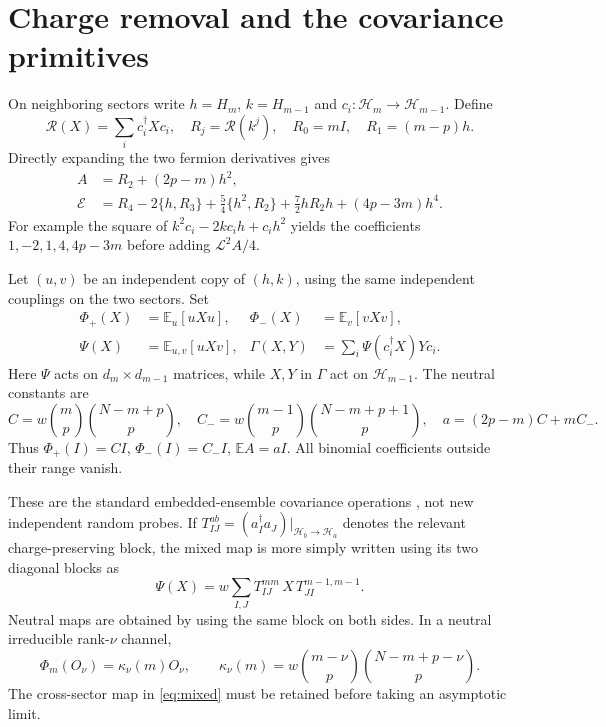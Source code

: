 \documentclass[11pt,a4paper]{article}
\newcommand{\EE}{\mathbb E}
\newcommand{\rr}{\mathcal R}
\newcommand{\core}{\mathcal E}
\begin{document}
\newpage
\section{Charge removal and the covariance primitives}
On neighboring sectors write $h=H_m$, $k=H_{m-1}$ and
$c_i:\mathcal H_m\to\mathcal H_{m-1}$. Define
\begin{equation}
 \rr(X)=\sum_i c_i^\dagger Xc_i,\quad R_j=\rr(k^j),\quad
 R_0=mI,\quad R_1=(m-p)h.
\end{equation}
Directly expanding the two fermion derivatives gives
\begin{align}
 A&=R_2+(2p-m)h^2,\\
 \core&=R_4-2\{h,R_3\}+\tfrac54\{h^2,R_2\}
                  +\tfrac72 hR_2h+(4p-3m)h^4. \label{eq:raw}
\end{align}
For example the square of
$k^2c_i-2kc_ih+c_ih^2$ yields the coefficients
$1,-2,1,4,4p-3m$ before adding $\mathcal L^2A/4$.

Let $(u,v)$ be an independent copy of $(h,k)$, using the same
independent couplings on the two sectors. Set
\begin{align}
 \Phi_+(X)&=\EE_u[uXu],&\Phi_-(X)&=\EE_v[vXv],\\
 \Psi(X)&=\EE_{u,v}[uXv],&
 \Gamma(X,Y)&=\sum_i\Psi(c_i^\dagger X)Yc_i. \label{eq:maps}
\end{align}
Here $\Psi$ acts on $d_m\times d_{m-1}$ matrices, while $X,Y$
in $\Gamma$ act on $\mathcal H_{m-1}$. The neutral constants are
\begin{equation}
 C=w\binom mp\binom{N-m+p}p,\quad
 C_-=w\binom{m-1}p\binom{N-m+p+1}p,\quad
 a=(2p-m)C+mC_-.
\end{equation}
Thus $\Phi_+(I)=CI$, $\Phi_-(I)=C_-I$, $\EE A=aI$.
All binomial coefficients outside their range vanish.

These are the standard embedded-ensemble covariance operations
\cite{Kota,TT}, not new independent random probes. If
$T^{ab}_{IJ}=(a_I^\dagger a_J)|_{\mathcal H_b\to\mathcal H_a}$
denotes the relevant charge-preserving block, the mixed map is more
simply written using its two diagonal blocks as
\begin{equation}
 \Psi(X)=w\sum_{I,J} T^{mm}_{IJ}\,X\,T^{m-1,m-1}_{JI}.
 \label{eq:mixed}
\end{equation}
Neutral maps are obtained by using the same block on both sides.
In a neutral irreducible rank-$\nu$ channel,
\begin{equation}
 \Phi_m(O_\nu)=\kappa_\nu(m)O_\nu,\qquad
 \kappa_\nu(m)=w\binom{m-\nu}p\binom{N-m+p-\nu}p.
\end{equation}
The cross-sector map in \eqref{eq:mixed} must be retained before
taking an asymptotic limit.
\end{document}

